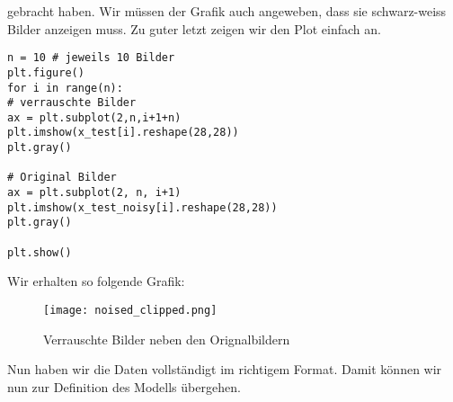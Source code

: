 gebracht haben. Wir müssen der Grafik auch angeweben, dass sie schwarz-weiss
Bilder anzeigen muss. Zu guter letzt zeigen wir den Plot einfach an.
\begin{verbatim}
n = 10 # jeweils 10 Bilder
plt.figure()
for i in range(n):
# verrauschte Bilder
ax = plt.subplot(2,n,i+1+n)
plt.imshow(x_test[i].reshape(28,28))
plt.gray()

# Original Bilder
ax = plt.subplot(2, n, i+1)
plt.imshow(x_test_noisy[i].reshape(28,28))
plt.gray()

plt.show()
\end{verbatim}
Wir erhalten so folgende Grafik:
\begin{figure}[h!]
  \centering
  \texttt{[image: noised\_clipped.png]}
  \caption{Verrauschte Bilder neben den Orignalbildern}
\end{figure}

\para{}
Nun haben wir die Daten vollständigt im richtigem Format. Damit können wir nun
zur Definition des Modells übergehen.



